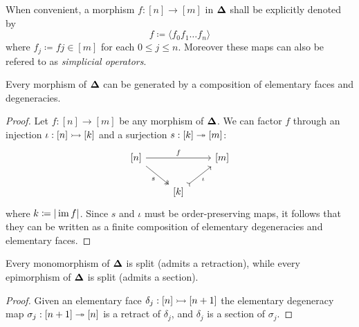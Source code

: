 \begin{notation}
    \label{not:simplex-morphisms}
    When convenient, a morphism \(f: [n] \to [m]\) in \({\mathbf{\Delta}}\) shall be explicitly
    denoted by
    \[
        f \coloneq \langle f_0 f_1 \dots f_n \rangle
    \]
    where \(f_j \coloneq f j \in [m]\) for each \(0 \leq j \leq n\). Moreover these
    maps can also be refered to as \emph{simplicial operators}.
\end{notation}

\begin{lemma}
    \label{lem:elementary-maps-generate-simplex-maps}
    Every morphism of \({\mathbf{\Delta}}\) can be generated by a composition of elementary
    faces and degeneracies.
\end{lemma}

\begin{proof}
    Let \(f: [n] \to [m]\) be any morphism of \({\mathbf{\Delta}}\). We can factor \(f\) through
    an injection \(\iota: [n] \rightarrowtail [k]\) and a surjection \(s: [k] \twoheadrightarrow [m]\):
    \[
        \begin{tikzcd}
            {[n]} \ar[rr, "f"] \ar[dr, two heads, "s"'] &&{[m]} \\
            &{[k]} \ar[ru, tail, "\iota"'] &
        \end{tikzcd}
    \]
    where \(k \coloneq |\operatorname{im} f|\). Since \(s\) and \(\iota\) must be order-preserving
    maps, it follows that they can be written as a finite composition of elementary
    degeneracies and elementary faces.
\end{proof}

\begin{corollary}
    \label{cor:mono-and-epi-in-Splx-are-split-mono-and-epi}
    Every monomorphism of \({\mathbf{\Delta}}\) is split (admits a retraction),
    while every epimorphism of \({\mathbf{\Delta}}\) is split (admits a section).
\end{corollary}

\begin{proof}
    Given an elementary face \(\delta_j: [n] \rightarrowtail [n+1]\) the elementary degeneracy
    map \(\sigma_j: [n+1] \twoheadrightarrow [n]\) is a retract of \(\delta_j\), and \(\delta_j\)
    is a section of \(\sigma_j\).
\end{proof}

